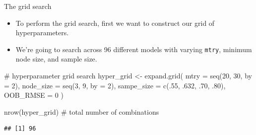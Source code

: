 \documentclass[
  10pt,
  ignorenonframetext,
]{beamer}
\newenvironment{Shaded}{}{}
\newcommand{\CommentTok}[1]{\textcolor[rgb]{0.00,0.50,0.00}{#1}}
\newcommand{\DataTypeTok}[1]{#1}
\newcommand{\DecValTok}[1]{#1}
\newcommand{\FloatTok}[1]{#1}
\newcommand{\KeywordTok}[1]{\textcolor[rgb]{0.00,0.00,1.00}{#1}}
\newcommand{\NormalTok}[1]{#1}
\newcommand{\StringTok}[1]{\textcolor[rgb]{0.00,0.50,0.50}{#1}}
\providecommand{\tightlist}{%
  \setlength{\itemsep}{0pt}\setlength{\parskip}{0pt}}
\begin{document}
\begin{frame}[fragile]{The grid search}
\protect\hypertarget{the-grid-search}{}

\begin{itemize}
\tightlist
\item
  To perform the grid search, first we want to construct our grid of
  hyperparameters.
\item
  We're going to search across 96 different models with varying
  \texttt{mtry}, minimum node size, and sample size.
\end{itemize}

\begin{Shaded}
\begin{Highlighting}[]
\CommentTok{# hyperparameter grid search}
\NormalTok{hyper_grid <-}\StringTok{ }\KeywordTok{expand.grid}\NormalTok{(}
  \DataTypeTok{mtry       =} \KeywordTok{seq}\NormalTok{(}\DecValTok{20}\NormalTok{, }\DecValTok{30}\NormalTok{, }\DataTypeTok{by =} \DecValTok{2}\NormalTok{),}
  \DataTypeTok{node_size  =} \KeywordTok{seq}\NormalTok{(}\DecValTok{3}\NormalTok{, }\DecValTok{9}\NormalTok{, }\DataTypeTok{by =} \DecValTok{2}\NormalTok{),}
  \DataTypeTok{sampe_size =} \KeywordTok{c}\NormalTok{(.}\DecValTok{55}\NormalTok{, }\FloatTok{.632}\NormalTok{, }\FloatTok{.70}\NormalTok{, }\FloatTok{.80}\NormalTok{),}
  \DataTypeTok{OOB_RMSE   =} \DecValTok{0}
\NormalTok{)}

\KeywordTok{nrow}\NormalTok{(hyper_grid) }\CommentTok{# total number of combinations}
\end{Highlighting}
\end{Shaded}

\begin{verbatim}
## [1] 96
\end{verbatim}

\end{frame}
\end{document}
